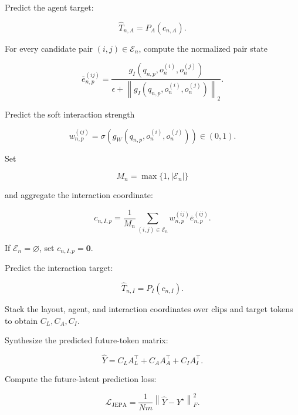 \begin{tcolorbox}
\begin{algsteps}
\item
Predict the agent target:

\[
\widehat T_{n,A}
=
P_A(c_{n,A}).
\]


\item
For every candidate pair
\((i,j)\in\mathcal E_n\), compute the normalized pair state

\[
\overline e_{n,p}^{(ij)}
=
\frac{
g_I
\left(
q_{n,p},
o_n^{(i)},
o_n^{(j)}
\right)
}{
\epsilon+
\left\|
g_I
\left(
q_{n,p},
o_n^{(i)},
o_n^{(j)}
\right)
\right\|_2
}.
\]

\item
Predict the soft interaction strength

\[
w_{n,p}^{(ij)}
=
\sigma
\left(
g_W
\left(
q_{n,p},
o_n^{(i)},
o_n^{(j)}
\right)
\right)
\in(0,1).
\]

\item
Set

\[
M_n=\max\{1,|\mathcal E_n|\}
\]

and aggregate the interaction coordinate:

\[
c_{n,I,p}
=
\frac{1}{M_n}
\sum_{(i,j)\in\mathcal E_n}
w_{n,p}^{(ij)}
\overline e_{n,p}^{(ij)}.
\]

If \(\mathcal E_n=\varnothing\), set
\(c_{n,I,p}=\mathbf 0\).

\item
Predict the interaction target:

\[
\widehat T_{n,I}
=
P_I(c_{n,I}).
\]


\item
Stack the layout, agent, and interaction coordinates over clips and
target tokens to obtain \(C_L,C_A,C_I\).

\item
Synthesize the predicted future-token matrix:

\[
\widehat Y
=
C_LA_L^\top
+
C_AA_A^\top
+
C_IA_I^\top.
\]


\item
Compute the future-latent prediction loss:

\[
\mathcal L_{\mathrm{JEPA}}
=
\frac{1}{Nm}
\left\|
\widehat Y-Y^\star
\right\|_F^2.
\]


\end{algsteps}
\end{tcolorbox}
